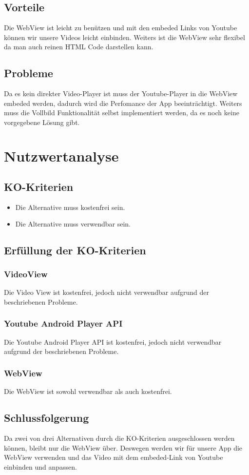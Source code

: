 \documentclass[article,10pt]{scrartcl}
\begin{document}
\subsection{Vorteile}
Die WebView ist leicht zu benützen und mit den embeded Links von Youtube können wir unsere Videos leicht einbinden. Weiters ist die WebView sehr flexibel da man auch reinen HTML Code darstellen kann.
\subsection{Probleme}
Da es kein direkter Video-Player ist muss der Youtube-Player in die WebView embeded werden, dadurch wird die Perfomance der App beeinträchtigt. Weiters muss die Vollbild Funktionalität selbst implementiert werden, da es noch keine vorgegebene Lösung gibt.


\section{Nutzwertanalyse}
\subsection{KO-Kriterien}
\begin{itemize}
\item Die Alternative muss kostenfrei sein.
\item Die Alternative muss verwendbar sein.
\end{itemize}
\subsection{Erfüllung der KO-Kriterien}
\subsubsection{VideoView}
Die Video View ist kostenfrei, jedoch nicht verwendbar aufgrund der beschriebenen Probleme.
\subsubsection{Youtube Android Player API}
Die Youtube Android Player API ist kostenfrei, jedoch nicht verwendbar aufgrund der beschriebenen Probleme.
\subsubsection{WebView}
Die WebView ist sowohl verwendbar als auch kostenfrei.
\subsection{Schlussfolgerung}
Da zwei von drei Alternativen durch die KO-Kriterien ausgeschlossen werden können, bleibt nur die WebView über. Deswegen werden wir für unsere App die WebView verwenden und das Video mit dem embeded-Link von Youtube einbinden und anpassen.
\end{document}
